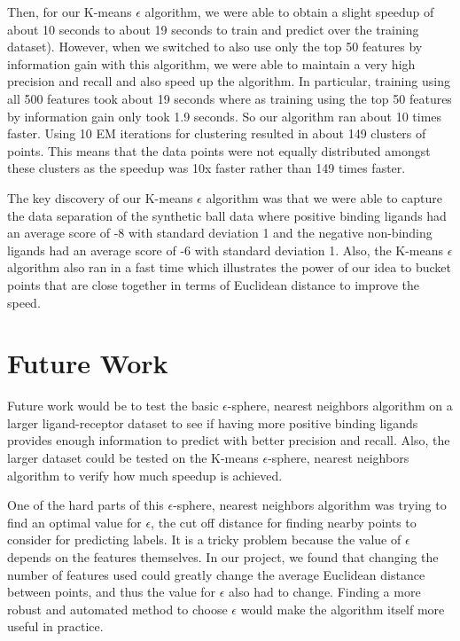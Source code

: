 \documentclass[11pt,letterpaper]{article}
\begin{document}
Then, for our K-means $\epsilon$ algorithm, we were able to obtain a slight speedup of about 10%
seconds to about 19 seconds to train and predict over the training dataset).  However, when we switched to also use only the top 50 features by information gain with this algorithm, we were able to maintain a very high precision and recall and also speed up the algorithm.  In particular, training using all 500 features took about 19 seconds where as training using the top 50 features by information gain only took 1.9 seconds.  So our algorithm ran about 10 times faster.  Using 10 EM iterations for clustering resulted in about 149 clusters of points.  This means that the data points were not equally distributed amongst these clusters as the speedup was 10x faster rather than 149 times faster.

The key discovery of our K-means $\epsilon$ algorithm was that we were able to capture the data separation of the synthetic ball data where positive binding ligands had an average score of -8 with standard deviation 1 and the negative non-binding ligands had an average score of -6 with standard deviation 1.  Also, the K-means $\epsilon$ algorithm also ran in a fast time which illustrates the power of our idea to bucket points that are close together in terms of Euclidean distance to improve the speed.

\section{Future Work}
Future work would be to test the basic $\epsilon$-sphere, nearest neighbors algorithm on a larger ligand-receptor dataset to see if having more positive binding ligands provides enough information to predict with better precision and recall.  Also, the larger dataset could be tested on the K-means $\epsilon$-sphere, nearest neighbors algorithm to verify how much speedup is achieved.

One of the hard parts of this $\epsilon$-sphere, nearest neighbors algorithm was trying to find an optimal value for $\epsilon$, the cut off distance for finding nearby points to consider for predicting labels.  It is a tricky problem because the value of $\epsilon$ depends on the features themselves.  In our project, we found that changing the number of features used could greatly change the average Euclidean distance between points, and thus the value for $\epsilon$ also had to change.  Finding a more robust and automated method to choose $\epsilon$ would make the algorithm itself more useful in practice.
\end{document}
